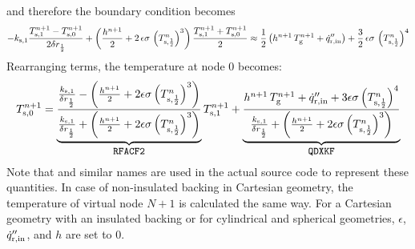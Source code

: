 and therefore the boundary condition becomes
\begin{equation}
\label{bc_front_4}
  -k_{\rm s,1} \frac{T_{\rm s,1}^{n+1}-T_{\rm s,0}^{n+1}}{2 \delta r_{\frac{1}{2}}} + \left( \frac{h^{n+1}}{2} + 2 \, \epsilon\sigma \, \left( T_{\rm s,\frac{1}{2}}^n \right)^3 \right) \frac{T_{\rm s,1}^{n+1}+T_{\rm s,0}^{n+1}}{2}
  \approx  \frac{1}{2} \left( h^{n+1} \, T_{\rm g}^{n+1} +
  \dot{q}_{\rm r, in}'' \right) + \frac{3}{2} \, \epsilon\sigma \, \left( T_{\rm s,\frac{1}{2}}^n \right)^4
\end{equation}
Rearranging terms, the temperature at node 0 becomes:
\begin{equation}
\label{T0}
  T_{\rm s,0}^{n+1} = \underbrace{\frac{\frac{k_{\rm s,1}}{\delta r_{\frac{1}{2}}}- \left(\frac{h^{n+1}}{2} + 2 \epsilon \sigma \left(T_{\rm s,\frac{1}{2}}^n\right)^3 \right)}{\frac{k_{\rm s,1}}{\delta r_{\frac{1}{2}}} + \left(\frac{h^{n+1}}{2} + 2 \epsilon \sigma \left( T_{\rm s,\frac{1}{2}}^n\right)^3 \right)}}_{\texttt{\small RFACF2}} T_{\rm s,1}^{n+1} +
 \underbrace{ \frac{  h^{n+1} \, T_{\rm g}^{n+1} + \dot{q}_{\rm r,in}'' + 3 \epsilon \sigma \left( T_{\rm s,\frac{1}{2}}^n\right)^4 }{\frac{k_{\rm s,1}}{\delta r_{\frac{1}{2}}}+\left(\frac{h^{n+1}}{2} + 2 \epsilon \sigma \left( T_{\rm s,\frac{1}{2}}^n\right)^3 \right)} }_{\texttt{\small QDXKF}}
\end{equation}
Note that  and similar names are used in the actual source code to represent these quantities.
In case of non-insulated backing in Cartesian geometry, the temperature of virtual node $N+1$ is calculated the same way.
For a Cartesian geometry with an insulated backing or for cylindrical and spherical geometries, $\epsilon$, $\dot{q}_{\rm r,in}''$, and $h$ are set to 0.

